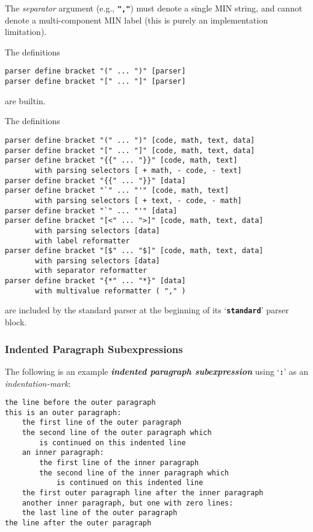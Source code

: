 \documentclass[12pt]{article}
\newcommand{\TT}[1]{{\tt \bfseries #1}}
\newcommand{\key}[1]{{\bf \em #1}\index{#1}}
\newenvironment{indpar}[1][0.3in]%
	{\begin{list}{}%
		     {\setlength{\itemsep}{0in}%
		      \setlength{\topsep}{0in}%
		      \setlength{\parsep}{1ex}%
		      \setlength{\labelwidth}{#1}%
		      \setlength{\leftmargin}{#1}%
		      \addtolength{\leftmargin}{\labelsep}}%
	 \item}%
	{\end{list}}
\begin{document}
\begin{indpar}
\begin{indpar}[0.5em]
The {\em separator} argument (e.g., \TT{","}) must denote
a single MIN string, and
cannot denote a multi-component MIN label (this is purely an implementation
limitation).
\end{indpar}

\end{indpar}



The definitions
\begin{indpar}\begin{verbatim}
parser define bracket "(" ... ")" [parser]
parser define bracket "[" ... "]" [parser]
\end{verbatim}\end{indpar}
are builtin.

The definitions
\begin{indpar}\begin{verbatim}
parser define bracket "(" ... ")" [code, math, text, data]
parser define bracket "[" ... "]" [code, math, text, data]
parser define bracket "{{" ... "}}" [code, math, text]
       with parsing selectors [ + math, - code, - text]
parser define bracket "{{" ... "}}" [data]
parser define bracket "`" ... "'" [code, math, text]
       with parsing selectors [ + text, - code, - math]
parser define bracket "`" ... "'" [data]
parser define bracket "[<" ... ">]" [code, math, text, data]
       with parsing selectors [data]
       with label reformatter
parser define bracket "[$" ... "$]" [code, math, text, data]
       with parsing selectors [data]
       with separator reformatter
parser define bracket "{*" ... "*}" [data]
       with multivalue reformatter ( "," )
\end{verbatim}\end{indpar}
are included by the standard parser at the beginning of
its `\TT{standard}' parser block.

\subsubsection{Indented Paragraph Subexpressions}
\label{INDENTED-PARAGRAPH-SUBEXPRESSIONS}

The following is an example
\key{indented paragraph subexpression}
using `\TT{:}' as an {\em indentation-mark}:
\begin{indpar}\begin{verbatim}
the line before the outer paragraph
this is an outer paragraph:
    the first line of the outer paragraph
    the second line of the outer paragraph which
        is continued on this indented line
    an inner paragraph:
        the first line of the inner paragraph
        the second line of the inner paragraph which
            is continued on this indented line
    the first outer paragraph line after the inner paragraph
    another inner paragraph, but one with zero lines:
    the last line of the outer paragraph
the line after the outer paragraph
\end{verbatim}\end{indpar}
\end{document}
